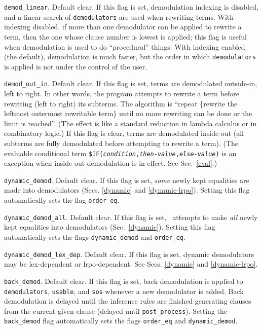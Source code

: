 \documentclass[11pt]{article}
\begin{document}
\noindent
\verb:demod_linear:.  Default clear.  If this flag is set,
demodulation indexing is disabled, and a linear search of \verb:demodulators:
are used when rewriting terms.
With indexing disabled, if more than one
demodulator can be applied to rewrite a term, then the one whose clause
number is lowest is applied; this flag is useful when
demodulation is used to do ``procedural'' things.  With indexing
enabled (the default), demodulation is much faster, but the order in
which \verb:demodulators: is applied is not under the control of the
user.

\noindent
\verb:demod_out_in:.  Default clear.  If this flag is set,
terms are demodulated outside-in, left to right.  In other words, the
program attempts to rewrite a term before rewriting (left to right)
its subterms.  The algorithm is ``repeat \{rewrite the leftmost
outermost rewritable term\} until no more rewriting can be done or
the limit is reached''.  (The effect is like a standard reduction in
lambda calculus or in combinatory logic.)  If this flag is clear,
terms are demodulated inside-out (all subterms are fully demodulated
before attempting to rewrite a term).  (The evaluable conditional term
{\tt \$IF({\it condition},{\it then-value},{\it else-value})} is an
exception when inside-out demodulation is in effect.  See Sec.~\ref{eval}.)

\noindent
\verb:dynamic_demod:.  Default clear.  If this flag is set,
{\it some} newly kept equalities are made into demodulators (Secs.
\ref{dynamic} and \ref{dynamic-lrpo}).
Setting this flag automatically sets the flag \verb:order_eq:.

\noindent
\verb:dynamic_demod_all:.  Default clear.  If this flag is set,
\otter\ attempts to make {\it all} newly kept equalities into demodulators
(Sec.~\ref{dynamic}).  Setting this flag automatically sets the flags
\verb:dynamic_demod: and \verb:order_eq:.

\noindent
\verb:dynamic_demod_lex_dep:.  Default clear.  If this flag is set,
dynamic demodulators may be lex-dependent or {\sc lrpo}-dependent.
See Secs. \ref{dynamic} and \ref{dynamic-lrpo}.

\noindent
\verb:back_demod:.  Default clear.  If this flag is set, back
demodulation is applied to \verb:demodulators:, \verb:usable:, and
\verb:sos: whenever a new demodulator is added.  Back demodulation is
delayed until the inference rules are finished generating clauses from
the current given clause (delayed until \verb:post_process:).  Setting
the
\verb:back_demod: flag automatically sets the flags \verb:order_eq: and
\verb:dynamic_demod:.
\end{document}
